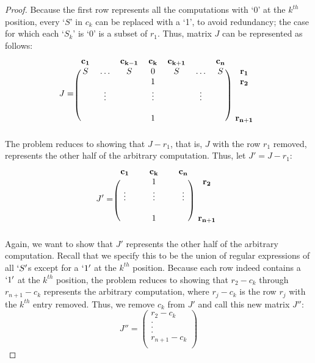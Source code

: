 \documentclass[runningheads]{llncs}
\begin{document}
\begin{proof}
Because the first row represents all the computations with `0' at the $k^{th}$ position, every `$S$' in $c_k$ can be replaced with a `1', to avoid redundancy; the case for which each `$S_k$' is `0' is a subset of $r_1$. Thus, matrix $J$ can be represented as follows:
\[
J = \begin{blockarray}{cccccccc}
\mathbf{c_1} & & \mathbf{c_{k-1}} & \mathbf{c_k} & \mathbf{c_{k+1}} & & \mathbf{c_n} \\
\begin{block}{(ccccccc)c}
    S & \hdots & S & 0 & S & \hdots & S & \mathbf{r_1}\\
     &  &  & 1 &  &  &  & \mathbf{r_2}\\
    &  \vdots &  & \vdots &  &  \vdots &  & \\
    &  &  &  &  & &  & \\
    & & & 1 & &  & & \mathbf{r_{n+1}}\\
\end{block}
\end{blockarray}
 \]
The problem reduces to showing that $J - r_1$, that is, $J$ with the row $r_1$ removed, represents the other half of the arbitrary computation. Thus, let $J' = J - r_1$:
\[
J' = \begin{blockarray}{cccccc}
\mathbf{c_1} &  & \mathbf{c_k} & & \mathbf{c_n} \\
\begin{block}{(ccccc)c}
     &   & 1 &   &  & \mathbf{r_2}\\
     \vdots & &  \vdots & & \vdots  & \\
    &   &   & &  & \\
    & & 1 &  & & \mathbf{r_{n+1}}\\
\end{block}
\end{blockarray}
 \]
Again, we want to show that $J'$ represents the other half of the arbitrary computation. Recall that we specify this to be the union of regular expressions of all $`S'$s except for a $`1'$ at the $k^{th}$ position. Because each row indeed contains a $`1'$ at the $k^{th}$ position, the problem reduces to showing that $r_2 - c_k$ through $r_{n+1} - c_k$ represents the arbitrary computation, where $r_j - c_k$ is the row $r_j$ with the $k^{th}$ entry removed. Thus, we remove $c_k$ from $J'$ and call this new matrix $J''$:
\[
 J'' = \begin{pmatrix}
    r_2 - c_k \\
    . \\
    . \\
    . \\
    r_{n+1} - c_k \\
    

\end{pmatrix}\]
\end{proof}
\end{document}
